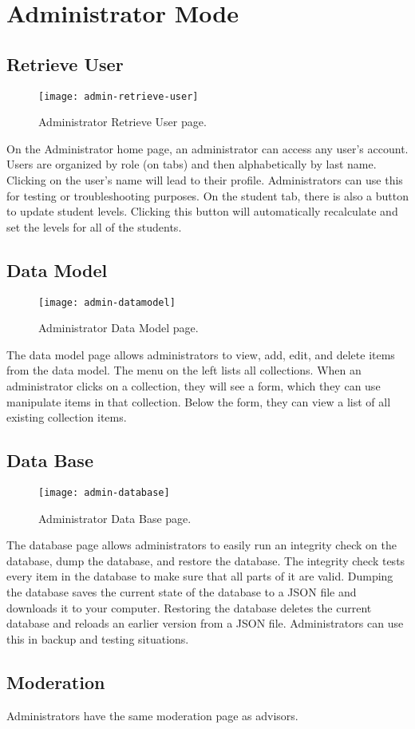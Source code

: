 \section{Administrator Mode}
\subsection{Retrieve User}
\begin{figure}[htbp!]
\centering
\texttt{[image: admin-retrieve-user]}
\caption{Administrator Retrieve User page.}
\end{figure}
On the Administrator home page, an administrator can access any user's account. Users are organized by role (on tabs) and then alphabetically by last name. Clicking on the user's name will lead to their profile. Administrators can use this for testing or troubleshooting purposes. On the student tab, there is also a button to update student levels. Clicking this button will automatically recalculate and set the levels for all of the students.

\subsection{Data Model}
\begin{figure}[htbp!]
\centering
\texttt{[image: admin-datamodel]}
\caption{Administrator Data Model page.}
\end{figure}
The data model page allows administrators to view, add, edit, and delete items from the data model. The menu on the left lists all collections. When an administrator clicks on a collection, they will see a form, which they can use manipulate items in that collection. Below the form, they can view a list of all existing collection items. 
\subsection{Data Base}
\begin{figure}[htbp!]
\centering
\texttt{[image: admin-database]}
\caption{Administrator Data Base page.}
\end{figure}
The database page allows administrators to easily run an integrity check on the database, dump the database, and restore the database. The integrity check tests every item in the database to make sure that all parts of it are valid. Dumping the database saves the current state of the database to a JSON file and downloads it to your computer. Restoring the database deletes the current database and reloads an earlier version from a JSON file. Administrators can use this in backup and testing situations.
\subsection{Moderation}
Administrators have the same moderation page as advisors. 